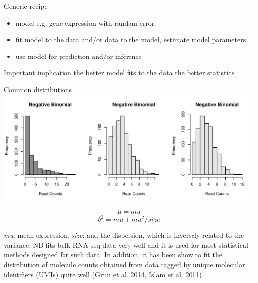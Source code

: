 \documentclass{beamer}\usepackage[]{graphicx}\usepackage[]{color}
\makeatletter
\def\maxwidth{ %
  \ifdim\Gin@nat@width>\linewidth
    \linewidth
  \else
    \Gin@nat@width
  \fi
}
\newenvironment{knitrout}{}{} %
\makeatother
\begin{document}
\begin{frame}
\begin{block}{Generic recipe}
\begin{itemize}
\item model e.g. gene expression with random error
\item fit model to the data and/or data to the model, estimate model parameters
\item use model for prediction and/or inference
\end{itemize}
\end{block}
\vspace{0.5cm}

\begin{block}{Important implication}
the better model \href{http://www.itl.nist.gov/div898/handbook/pmd/section4/pmd44.htm}{fits} to the data the better statistics
\end{block}
\end{frame}


\begin{frame}
\begin{block}{Common distributions}
\begin{knitrout}
\color{fgcolor}
\includegraphics[width=\maxwidth]{figure/dist-NB-1} 

\end{knitrout}
\tiny
$$\mu=mu$$
$$\delta^2=mu+mu^2/size$$

\textit{mu}: mean expression, \textit{size}: and the dispersion, which is inversely related to the variance. NB fits bulk RNA-seq data very well and it is used for most statistical methods designed for such data. In addition, it has been show to fit the distribution of molecule counts obtained from data tagged by unique molecular identifiers (UMIs) quite well (Grun et al. 2014, Islam et al. 2011).

\end{block}
\end{frame}
\end{document}
